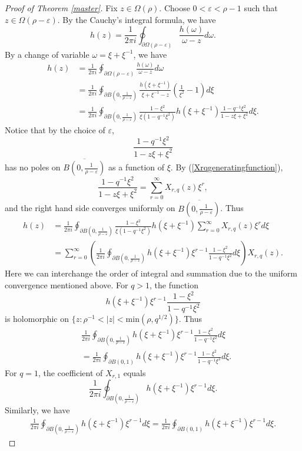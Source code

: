 \documentclass[10pt,a4paper]{amsart}
\begin{document}
\begin{proof}[Proof of Theorem \ref{master}]
    Fix $z \in \Omega(\rho)$. Choose $0<\varepsilon<\rho-1$ such that $z \in \Omega(\rho-\varepsilon)$. By the Cauchy's integral formula, we have 
    $$h(z)=\frac{1}{2\pi i}\oint_{\partial \Omega(\rho-\varepsilon)}\frac{h(\omega)}{\omega-z}d\omega.$$
    By a change of variable $\omega=\xi+\xi^{-1}$, we have
    \begin{equation}
        \begin{aligned}
    h(z)&=\frac{1}{2\pi i}\oint_{\partial \Omega(\rho-\varepsilon)}\frac{h(\omega)}{\omega-z}d\omega\\
    &=\frac{1}{2\pi i}\oint_{\partial B(0, \frac{1}{\rho-\varepsilon})}\frac{h(\xi+\xi^{-1})}{\xi+\xi^{-1}-z}(\frac{1}{\xi^2}-1)d\xi\\
    &=\frac{1}{2\pi i}\oint_{\partial B(0, \frac{1}{\rho-\varepsilon})} \frac{1-\xi^2}{\xi(1-q^{-1}\xi^2)} h(\xi+\xi^{-1}) \frac{1-q^{-1}\xi^2}{1-z\xi+\xi^2}d\xi.
\end{aligned}
    \end{equation}
    Notice that by the choice of $\varepsilon$, 
    $$\frac{1-q^{-1}\xi^2}{1-z\xi+\xi^2}$$ has no poles on $\overline{ B(0, \frac{1}{\rho-\varepsilon})}$ as a function of $\xi$. By (\ref{Xrqgeneratingfunction}), 
    $$\frac{1-q^{-1}\xi^2}{1-z\xi+\xi^2}=\sum_{r=0}^{\infty}X_{r,q}(z)\xi^r,$$
    and the right hand side converges uniformly on $\overline{ B(0, \frac{1}{\rho-\varepsilon})}$. Thus 
    $$
    \begin{aligned}
    h(z)&=\frac{1}{2\pi i}\oint_{\partial B(0, \frac{1}{\rho-\varepsilon})} \frac{1-\xi^2}{\xi(1-q^{-1}\xi^2)} h(\xi+\xi^{-1}) \sum_{r=0}^{\infty}X_{r,q}(z) \xi^r d\xi\\
    &=\sum_{r=0}^{\infty} \left( \frac{1}{2\pi i}\oint_{\partial B(0, \frac{1}{\rho-\varepsilon})} h(\xi+\xi^{-1})\xi^{r-1}\frac{1-\xi^2}{1-q^{-1}\xi^2}d\xi \right) X_{r,q}(z).
\end{aligned}$$
Here we can interchange the order of integral and summation due to the uniform convergence mentioned above.
For $q>1$, the function 
$$h(\xi+\xi^{-1})\xi^{r-1}\frac{1-\xi^2}{1-q^{-1}\xi^2}$$ is holomorphic on $\{z:\rho^{-1}<|z|<\mathrm{min}(\rho, q^{1/2}) \}$. Thus 
$$
\begin{aligned}
    &\frac{1}{2\pi i}\oint_{\partial B(0, \frac{1}{\rho-\varepsilon})} h(\xi+\xi^{-1})\xi^{r-1}\frac{1-\xi^2}{1-q^{-1}\xi^2}d\xi\\
    &=\frac{1}{2\pi i}\oint_{\partial B(0, 1)} h(\xi+\xi^{-1})\xi^{r-1}\frac{1-\xi^2}{1-q^{-1}\xi^2}d\xi.
\end{aligned}
$$
For $q=1$, the coefficient of $X_{r,1}$ equals
$$\frac{1}{2\pi i}\oint_{\partial B(0, \frac{1}{\rho-\varepsilon})} h(\xi+\xi^{-1})\xi^{r-1}d\xi.$$
Similarly, we have 
$$
\begin{aligned}
    \frac{1}{2\pi i}\oint_{\partial B(0, \frac{1}{\rho-\varepsilon})} h(\xi+\xi^{-1})\xi^{r-1}d\xi=\frac{1}{2\pi i}\oint_{\partial B(0, 1)} h(\xi+\xi^{-1})\xi^{r-1}d\xi.
\end{aligned}
$$


\end{proof}
\end{document}
